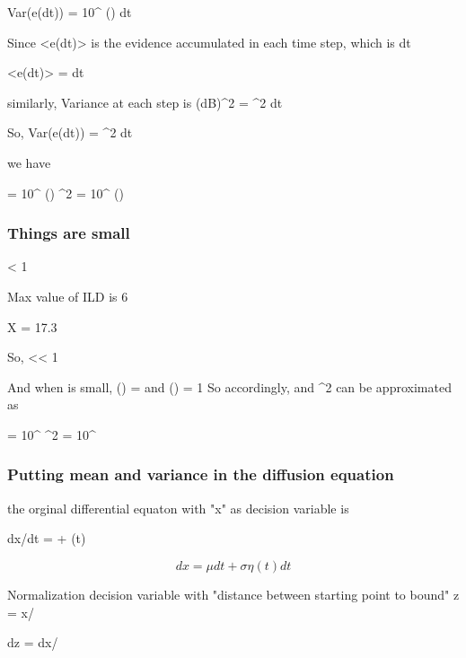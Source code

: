 Var(e(dt)) =     10^{\lambda {}} \cosh\left(\lambda {}\right) dt


Since
 <e(dt)> is the evidence accumulated in each time step, which is \mu dt

 <e(dt)> = \mu dt

  similarly, Variance at each step is (\sigma dB)^2 = \sigma^2 dt

  
So,  Var(e(dt)) = \sigma^2 dt

  we have 

  \mu =      10^{\lambda {}} \sinh\left(\lambda {}\right) 
 \sigma^2 =     10^{\lambda {}} \cosh\left(\lambda {}\right)


 \subsubsection{Things are small}

 \lambda < 1 

 Max value of ILD is 6

 X = 17.3

    So, \lambda {} << 1


And when \phi is small, \sinh(\phi) = \phi and \cosh(\phi) = 1
So accordingly, \mu and \sigma^2 can be approximated as 

\mu =      10^{\lambda {}} \lambda {} 
 \sigma^2 =     10^{\lambda {}}


 \subsubsection{Putting mean and variance in the diffusion equation}

 the orginal differential equaton with "x" as decision variable is
 
 dx/dt = \mu + \sigma \eta(t)

\begin{equation}
    dx = \mu dt + \sigma \eta(t) dt
    \label{eq:og_diff}
\end{equation}

 Normalization decision variable with "distance between starting point to bound" \theta
 z = x/\theta

 dz = dx/\theta

